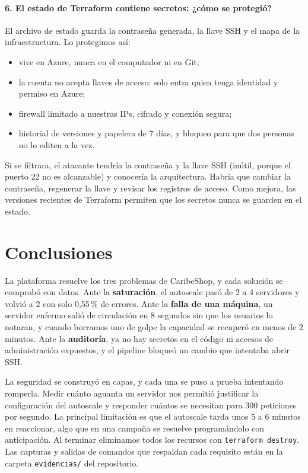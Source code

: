 \paragraph{6. El estado de Terraform contiene secretos: ¿cómo se protegió?}
El archivo de estado guarda la contraseña generada, la llave SSH y el mapa de la infraestructura.
Lo protegimos así:
\begin{itemize}
  \item vive en Azure, nunca en el computador ni en Git;
  \item la cuenta no acepta llaves de acceso: solo entra quien tenga identidad y permiso en Azure;
  \item firewall limitado a nuestras IPs, cifrado y conexión segura;
  \item historial de versiones y papelera de 7 días, y bloqueo para que dos personas no lo editen
        a la vez.
\end{itemize}
Si se filtrara, el atacante tendría la contraseña y la llave SSH (inútil, porque el puerto 22 no es
alcanzable) y conocería la arquitectura. Habría que cambiar la contraseña, regenerar la llave y
revisar los registros de acceso. Como mejora, las versiones recientes de Terraform permiten que
los secretos nunca se guarden en el estado.

\section{Conclusiones}
La plataforma resuelve los tres problemas de CaribeShop, y cada solución se comprobó con datos.
Ante la \textbf{saturación}, el autoscale pasó de 2 a 4 servidores y volvió a 2 con solo 0,55\,\%
de errores. Ante la \textbf{falla de una máquina}, un servidor enfermo salió de circulación en
8 segundos sin que los usuarios lo notaran, y cuando borramos uno de golpe la capacidad se
recuperó en menos de 2 minutos. Ante la \textbf{auditoría}, ya no hay secretos en el código ni
accesos de administración expuestos, y el pipeline bloqueó un cambio que intentaba abrir SSH.

La seguridad se construyó en capas, y cada una se puso a prueba intentando romperla. Medir cuánto
aguanta un servidor nos permitió justificar la configuración del autoscale y responder cuántos se
necesitan para 300 peticiones por segundo. La principal limitación es que el autoscale tarda unos
5 a 6 minutos en reaccionar, algo que en una campaña se resuelve programándolo con anticipación.
Al terminar eliminamos todos los recursos con \texttt{terraform destroy}. Las capturas y salidas
de comandos que respaldan cada requisito están en la carpeta \texttt{evidencias/} del repositorio.
